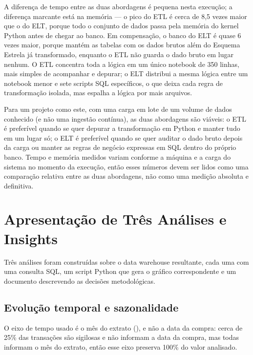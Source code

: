 \documentclass[12pt,a4paper]{article}
\newcommand{\code}[1]{\texttt{\detokenize{#1}}}
\begin{document}
A diferença de tempo entre as duas abordagens é pequena nesta execução; a
diferença marcante está na memória --- o pico do ETL é cerca de 8,5 vezes
maior que o do ELT, porque todo o conjunto de dados passa pela memória do
kernel Python antes de chegar ao banco. Em compensação, o banco do ELT é
quase 6 vezes maior, porque mantém as tabelas \code{raw_cpgf_*} com os
dados brutos além do Esquema Estrela já transformado, enquanto o ETL não
guarda o dado bruto em lugar nenhum. O ETL concentra toda a lógica em um
único notebook de 350 linhas, mais simples de acompanhar e depurar; o ELT
distribui a mesma lógica entre um notebook menor e sete scripts SQL
específicos, o que deixa cada regra de transformação isolada, mas espalha
a lógica por mais arquivos.

Para um projeto como este, com uma carga em lote de um volume de dados
conhecido (e não uma ingestão contínua), as duas abordagens são viáveis: o
ETL é preferível quando se quer depurar a transformação em Python e manter
tudo em um lugar só; o ELT é preferível quando se quer auditar o dado bruto
depois da carga ou manter as regras de negócio expressas em SQL dentro do
próprio banco. Tempo e memória medidos variam conforme a máquina e a carga
do sistema no momento da execução, então esses números devem ser lidos como
uma comparação relativa entre as duas abordagens, não como uma medição
absoluta e definitiva.

\section{Apresentação de Três Análises e Insights}
\label{sec:analises}

Três análises foram construídas sobre o data warehouse resultante, cada uma
com uma consulta SQL, um script Python que gera o gráfico correspondente e
um documento descrevendo as decisões metodológicas.

\subsection{Evolução temporal e sazonalidade}

O eixo de tempo usado é o mês do extrato (\code{id_mes_extrato}), e não a
data da compra: cerca de 25\% das transações são sigilosas e não informam a
data da compra, mas todas informam o mês do extrato, então esse eixo
preserva 100\% do valor analisado.
\end{document}
